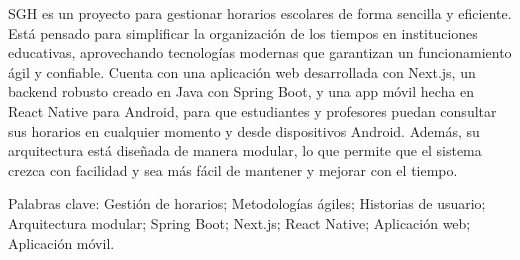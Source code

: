 SGH es un proyecto para gestionar horarios escolares de forma sencilla y eficiente. Está pensado para simplificar la organización de los tiempos en instituciones educativas, aprovechando tecnologías modernas que garantizan un funcionamiento ágil y confiable. Cuenta con una aplicación web desarrollada con Next.js, un backend robusto creado en Java con Spring Boot, y una app móvil hecha en React Native para Android, para que estudiantes y profesores puedan consultar sus horarios en cualquier momento y desde dispositivos Android. Además, su arquitectura está diseñada de manera modular, lo que permite que el sistema crezca con facilidad y sea más fácil de mantener y mejorar con el tiempo.

Palabras clave: Gestión de horarios; Metodologías ágiles; Historias de usuario; Arquitectura modular; Spring Boot; Next.js; React Native; Aplicación web; Aplicación móvil.
